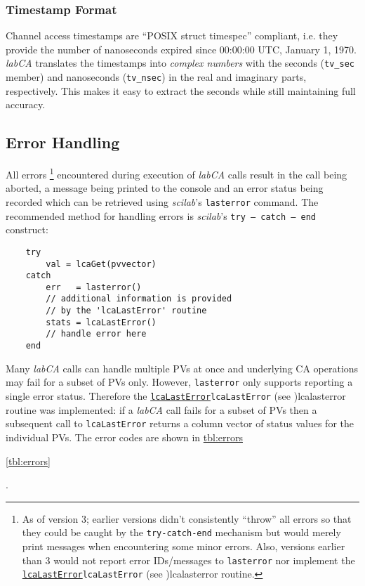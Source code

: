 \documentclass{article}
\newcommand{\sca}{\ita{labCA}}
\newcommand{\scilab}{\ita{scilab}}
\newcommand{\com}[1]{{\tt #1}}
\newcommand{\comref}[2]{\hyperref[ref]{\com{#1}}{\com{#1} (see }{)}{#2}}
\newcommand{\ita}[1]{\emph{#1}}
\begin{document}
\subsubsection{Timestamp Format}
\label{tsformat}
Channel access timestamps are ``POSIX struct timespec''
compliant, i.e. they provide the number of nanoseconds
expired since 00:00:00 UTC, January 1, 1970. \sca{} 
translates the timestamps into \ita{complex numbers}
with the seconds (\com{tv\_sec} member) and nanoseconds
(\com{tv\_nsec}) in the real and imaginary parts, respectively.
This makes it easy to extract the seconds while still maintaining
full accuracy.

\subsection{Error Handling}
\label{errorhandling}
All errors%
\footnote{As of version 3; earlier versions didn't consistently
``throw'' all errors so that they could be caught by the
\com{try-catch-end} mechanism but would merely print messages
when encountering some minor errors. Also, versions earlier than 3
would not report error IDs/messages to \com{lasterror} nor
implement the \comref{lcaLastError}{lcalasterror} routine.}
encountered during execution of \sca{} calls result in the
call being aborted, a message being printed to the console
and an error status being recorded which
can be retrieved using \scilab{}'s \com{lasterror} command.
The recommended method for handling errors is \scilab{}'s
\mbox{\com{try -- catch -- end}} construct:
\begin{verbatim}
	try
		val = lcaGet(pvvector)
	catch
		err   = lasterror()
		// additional information is provided
		// by the 'lcaLastError' routine
		stats = lcaLastError()
		// handle error here
	end
\end{verbatim}
Many \sca{} calls can handle multiple PVs at once
and underlying CA operations may fail for a subset of PVs only.
However, \com{lasterror} only supports reporting a single error
status. Therefore the \comref{lcaLastError}{lcalasterror} routine
was implemented: if a \sca{} call fails for a subset of PVs then
a subsequent call to \com{lcaLastError} returns a column vector
of status values for the individual PVs.
The error codes are shown in
\hyperref{Table~}{Table~}{}{tbl:errors}%
\begin{htmlonly}
\ref{tbl:errors}%
\end{htmlonly}
.
\end{document}
